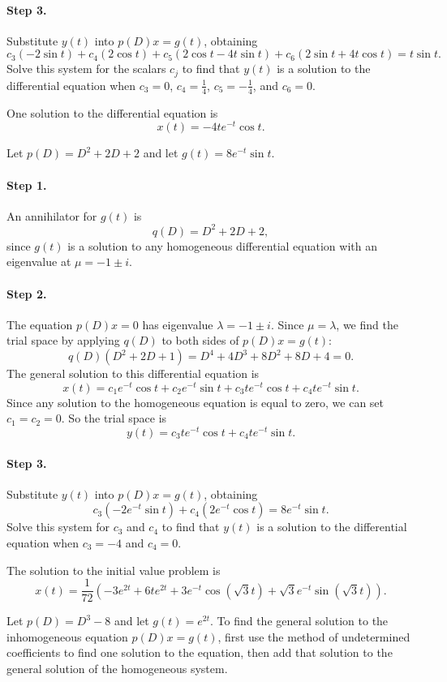\documentclass{ximera}
\begin{document}
\paragraph{Step 3.} Substitute $y(t)$ into $p(D)x = g(t)$, obtaining
\[
c_3(-2\sin t) + c_4(2\cos t) + c_5(2\cos t - 4t\sin t) +
c_6(2\sin t + 4t\cos t) = t\sin t.
\]
Solve this system for the scalars $c_j$ to find that $y(t)$ is a solution
to the differential equation when $c_3 = 0$, $c_4 = \frac{1}{4}$,
$c_5 = -\frac{1}{4}$, and $c_6 = 0$.

 \ans One solution to the differential equation is
\[
x(t) = -4te^{-t}\cos t.
\]

\soln Let $p(D) = D^2 + 2D + 2$ and let $g(t) = 8e^{-t}\sin t$.
\paragraph{Step 1.} An annihilator for $g(t)$ is
\[
q(D) = D^2 + 2D + 2,
\]
since $g(t)$ is a solution to any homogeneous differential equation
with an eigenvalue at $\mu = -1 \pm i$.

\paragraph{Step 2.} The equation $p(D)x = 0$ has eigenvalue
$\lambda = -1 \pm i$.  Since $\mu = \lambda$, we find the trial space
by applying $q(D)$ to both sides of $p(D)x = g(t)$:
\[
q(D)(D^2 + 2D + 1) = D^4 + 4D^3 + 8D^2 + 8D + 4	= 0.
\]
The general solution to this differential equation is
\[
x(t) = c_1e^{-t}\cos t + c_2e^{-t}\sin t + c_3te^{-t}\cos t +
c_4te^{-t}\sin t.
\]
Since any solution to the homogeneous equation is equal to zero, we can
set $c_1 = c_2 = 0$.  So the trial space is
\[
y(t) = c_3te^{-t}\cos t + c_4te^{-t}\sin t.
\]
\paragraph{Step 3.} Substitute $y(t)$ into $p(D)x = g(t)$, obtaining
\[
c_3(-2e^{-t}\sin t) + c_4(2e^{-t}\cos t) = 8e^{-t}\sin t.
\]
Solve this system for $c_3$ and $c_4$ to find that $y(t)$ is a solution
to the differential equation when $c_3 = -4$ and $c_4 = 0$.

 \ans The solution to the initial value problem is
\[
x(t) = \frac{1}{72}(-3e^{2t} + 6te^{2t} + 3e^{-t}\cos(\sqrt{3}t)
+ \sqrt{3}e^{-t}\sin(\sqrt{3}t)).
\]

\soln Let $p(D) = D^3 - 8$ and let $g(t) = e^{2t}$.  To find the general
solution to the inhomogeneous equation $p(D)x = g(t)$, first use the
method of undetermined coefficients to find one solution to the
equation, then add that solution to the general solution of the
homogeneous system.
\end{document}

